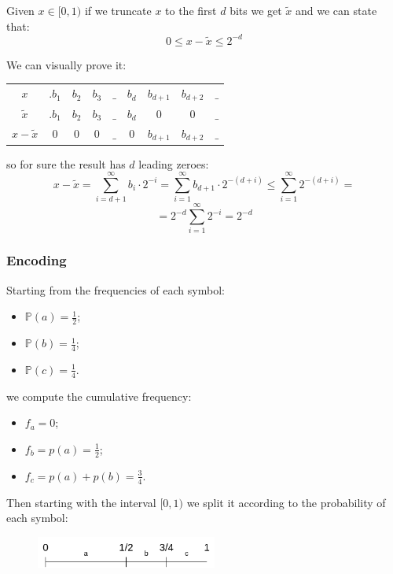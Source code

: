 Given $x \in [0,1)$ if we truncate $x$ to the first $d$ bits we get $\tilde{x}$ and we can state that:
$$
    0 \leq x-\tilde{x} \leq 2^{-d}
$$

We can visually prove it:
\begin{table}[H]
    \centering
    \begin{tabular}{c c c c c c | c c c}
        $x $ & $.b_1$ & $b_2$ & $b_3$ & $\_$ & $b_d$ & $b_{d+1}$ & $b_{d+2}$ & $\_$ \\
        $\tilde{x} $ & $.b_1$ & $b_2$ & $b_3$ & $\_$ & $b_d$ & $0$ & $0$ & $\_$ \\
        $x-\tilde{x} $ & $0$ & $0$ & $0$ & $\_$ & $0$ & $b_{d+1}$ & $b_{d+2}$ & $\_$ \\
    \end{tabular}
\end{table}
so for sure the result has $d$ leading zeroes:
$$
    x-\tilde{x} = \sum_{i=d+1}^\infty b_i \cdot 2^{-i} = \sum_{i=1}^\infty b_{d+1} \cdot 2^{-(d+i)} \leq \sum_{i=1}^\infty 2^{-(d+i)} = 
$$
$$
    = 2^{-d} \sum_{i=1}^\infty 2^{-i} = 2^{-d}
$$

\subsubsection{Encoding}
Starting from the frequencies of each symbol:
\begin{itemize}
    \item $\mathbb{P}(a) = \frac{1}{2}$;
    \item $\mathbb{P}(b) = \frac{1}{4}$;
    \item $\mathbb{P}(c) = \frac{1}{4}$.
\end{itemize}
we compute the cumulative frequency:
\begin{itemize}
    \item $f_a = 0$;
    \item $f_b = p(a) = \frac{1}{2}$;
    \item $f_c = p(a) + p(b) = \frac{3}{4}$.
\end{itemize}

Then starting with the interval $[0, 1)$ we split it according to the probability of each symbol:
\begin{figure}[H]
    \centering
    \includegraphics[width=225px]{images/10_Data_compression/arithmetic_encoding_0.png}
\end{figure}

